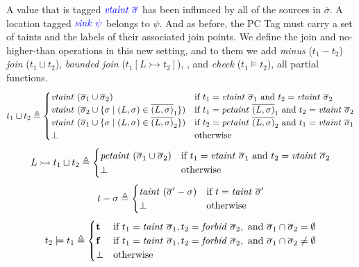\documentclass[acmsmall,review,anonymous]{acmart}\settopmatter{printfolios=true,printccs=false,printacmref=false}
\begin{document}
A value that is tagged \(\mathit{\color{blue} vtaint ~ \overline{\sigma}}\) has been influnced
by all of the sources in \(\overline{\sigma}\). A location tagged \(\mathit{\color{blue} sink ~ \psi}\)
belongs to \(\psi\). And as before, the PC Tag must carry a set of taints and
the labels of their associated join points.
%
We define the join and no-higher-than operations in this new setting, and to them
we add {\em minus} (\(t_1 - t_2\))
{\em join} (\(t_1 \sqcup t_2\)), {\em bounded join}
(\(t_1 [L \rightarrowtail t_2]\)), , and {\em check} (\(t_1 \models t_2\)),
all partial functions.
%
\[t_1 \sqcup t_2 \triangleq
\begin{cases}
  \mathit{vtaint} ~ (\overline{\sigma}_1 \cup \overline{\sigma}_2) &
  \textnormal{if } t_1 = \mathit{vtaint} ~ \overline{\sigma}_1 \textnormal{ and }
  t_2 = \mathit{vtaint} ~ \overline{\sigma}_2\\
  \mathit{vtaint} ~ (\overline{\sigma}_2 \cup \{\sigma \mid (L,\sigma) \in \overline{(L,\sigma)}_1\}) &
  \textnormal{if } t_1 = \mathit{pctaint} ~ \overline{(L,\sigma)}_1 \textnormal{ and }
  t_2 = \mathit{vtaint} ~ \overline{\sigma}_2\\
  \mathit{vtaint} ~ (\overline{\sigma}_1 \cup \{\sigma \mid (L,\sigma) \in \overline{(L,\sigma)}_2\}) &
  \textnormal{if } t_2 = \mathit{pctaint} ~ \overline{(L,\sigma)}_2 \textnormal{ and }
  t_1 = \mathit{vtaint} ~ \overline{\sigma}_1\\
  \bot & \textnormal{otherwise} \\
\end{cases}\]
%
\[L \rightarrowtail t_1 \sqcup t_2 \triangleq
\begin{cases}
  \mathit{pctaint} ~ (\overline{\sigma}_1 \cup \overline{\sigma}_2) &
  \textnormal{if } t_1 = \mathit{vtaint} ~ \overline{\sigma}_1 \textnormal{ and }
  t_2 = \mathit{vtaint} ~ \overline{\sigma}_2\\
  \bot & \textnormal{otherwise} \\
\end{cases}\]
%
\[t - \sigma \triangleq
\begin{cases}
  \mathit{taint} ~ (\overline{\sigma}' - \sigma) &
  \textnormal{if } t = \mathit{taint} ~ \overline{\sigma}' \\
  \bot & \textnormal{otherwise} \\
\end{cases}\]
%
\[t_2 \models t_1 \triangleq
\begin{cases}
  \mathbf{t} & \textnormal{if } t_1 = \mathit{taint} ~ \overline{\sigma}_1,
  t_2 = \mathit{forbid} ~ \overline{\sigma}_2, \textnormal{ and }
  \overline{\sigma}_1 \cap \overline{\sigma}_2 = \emptyset \\
  \mathbf{f} & \textnormal{if } t_1 = \mathit{taint} ~ \overline{\sigma}_1,
  t_2 = \mathit{forbid} ~ \overline{\sigma}_2, \textnormal{ and }
  \overline{\sigma}_1 \cap \overline{\sigma}_2 \not = \emptyset \\
  \bot & \textnormal{otherwise} \\
\end{cases}\]
\end{document}
